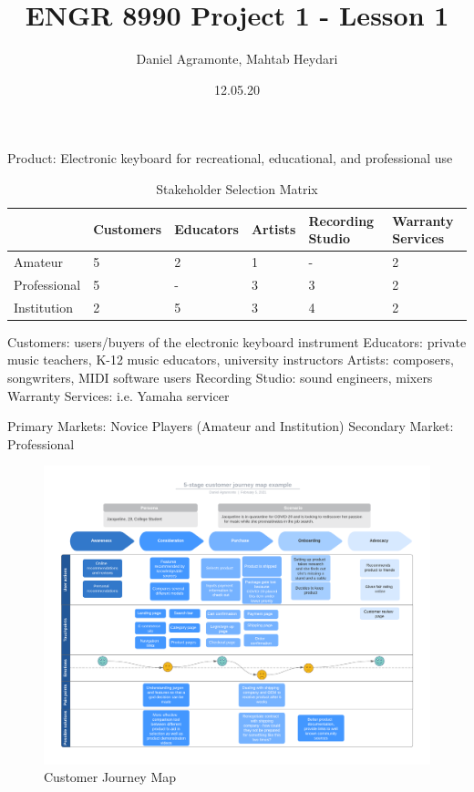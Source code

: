 \documentclass{article}
\title{\Huge ENGR 8990 Project 1 - Lesson 1} \author{Daniel Agramonte, Mahtab Heydari} \date{12.05.20}
\begin{document}
\maketitle

Product: Electronic keyboard for recreational, educational, and professional use 
\begin{table}[H]
    \centering
    \begin{tabular}{|p{2cm}||p{2cm}|p{2cm}|p{1.5cm}|p{2cm}|p{2cm}|}
        \hline
        & Customers & Educators & Artists & Recording Studio & Warranty Services\\
        \hline
        \hline
        Amateur & 5 & 2 & 1 & - & 2 \\
        \hline
        Professional & 5 & - & 3 & 3 & 2 \\
        \hline
        Institution & 2 & 5 & 3 & 4 & 2 \\
        \hline
    \end{tabular}
    \caption{Stakeholder Selection Matrix}
    \label{tab:Stakeholder_Selection_Matrix}
\end{table}

Customers: users/buyers of the electronic keyboard instrument
\newline
Educators: private music teachers, K-12 music educators, university instructors
\newline 
Artists: composers, songwriters, MIDI software users
\newline 
Recording Studio: sound engineers, mixers
\newline
Warranty Services: i.e. Yamaha servicer

Primary Markets: Novice Players (Amateur and Institution) \newline 
Secondary Market: Professional

\newpage
\thispagestyle{plain}
\begin{figure}
    \vspace{-10pt}
    \centering
    \includegraphics[trim=0 0 0 100,clip,width=\textwidth]{ENGR 8990/Projects/Project 1/Figures/5-stage customer journey map.pdf}
    \captionsetup{justification=raggedright,singlelinecheck=false}
    \caption{Customer Journey Map}
    \label{fig:CJM}
\end{figure}
\restoregeometry
\end{document}

